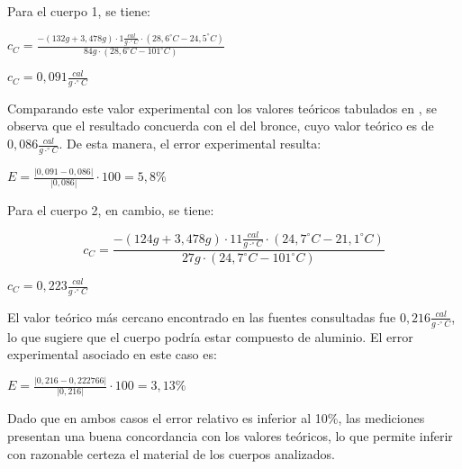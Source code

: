 \documentclass[12pt, a4paper]{article}
\begin{document}
Para el cuerpo 1, se tiene:

\begin{center}
    $ c_C = \frac{ - (132g + 3,478g) \cdot 1 \frac{cal}{g \cdot ^\circ C} \cdot (28,6^\circ C - 24,5^\circ C) }{ 84g \cdot (28,6^\circ C - 101^\circ C) } $
\end{center}
\begin{center}
    $ c_C = 0,091 \frac{cal}{g \cdot ^\circ C} $
\end{center}

Comparando este valor experimental con los valores teóricos tabulados en \cite{educamix_capacidad, fisicanet_calor}, se observa que el resultado concuerda con el del bronce, cuyo valor teórico es de $ 0,086 \frac{cal}{g \cdot ^\circ C} $. De esta manera, el error experimental resulta:

\begin{center}
    $ E =  \frac{|0,091-0,086|}{|0,086|}\cdot 100 = 5,8 \% $
\end{center}

Para el cuerpo 2, en cambio, se tiene:

\begin{equation}
    c_C = \frac{ - (124g + 3,478g) \cdot 11 \frac{cal}{g \cdot ^\circ C} \cdot (24,7^\circ C - 21,1^\circ C) }{ 27g \cdot (24,7^\circ C - 101^\circ C) }
\end{equation}
\begin{center}
    $ c_C = 0,223 \frac{cal}{g \cdot ^\circ C} $
\end{center}

El valor teórico más cercano encontrado en las fuentes consultadas \cite{educamix_capacidad,fisicanet_calor} fue $ 0,216 \frac{cal}{g \cdot ^\circ C} $, lo que sugiere que el cuerpo podría estar compuesto de aluminio. El error experimental asociado en este caso es:
\begin{center}
    $ E =  \frac{|0,216-0,222766|}{|0,216|}\cdot 100 = 3,13 \% $
\end{center}

Dado que en ambos casos el error relativo es inferior al 10\%, las mediciones presentan una buena concordancia con los valores teóricos, lo que permite inferir con razonable certeza el material de los cuerpos analizados.


\newpage
 
\end{document}
